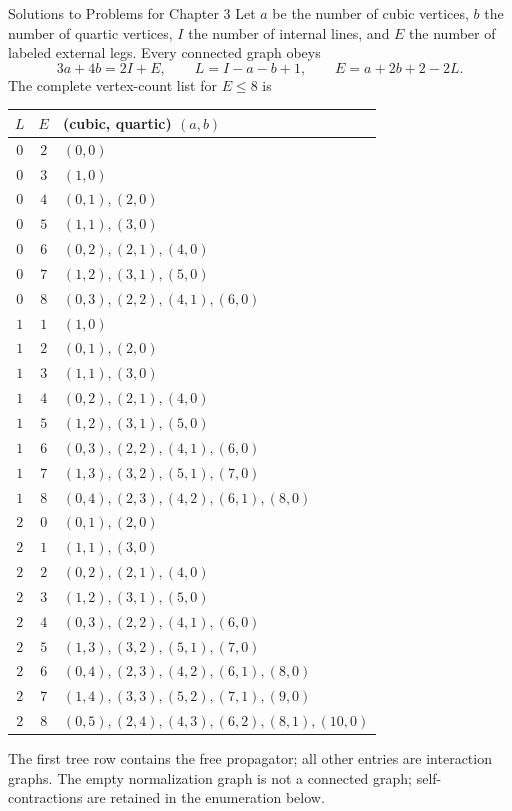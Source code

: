 \begin{bankssolutions}{Solutions to Problems for Chapter 3}
Let $a$ be the number of cubic vertices, $b$ the number of quartic vertices,
$I$ the number of internal lines, and $E$ the number of labeled external legs.
Every connected graph obeys
\begin{equation*}
 3a+4b=2I+E,
 \qquad L=I-a-b+1,
 \qquad E=a+2b+2-2L.
\end{equation*}
The complete vertex-count list for $E\le8$ is
\begin{center}
\small
\begin{tabular}{c|c|l}
 $L$ & $E$ & (cubic, quartic) $(a,b)$ \\ \hline
 $0$ & $2$ & $(0,0)$ \\
 $0$ & $3$ & $(1,0)$ \\
 $0$ & $4$ & $(0,1),(2,0)$ \\
 $0$ & $5$ & $(1,1),(3,0)$ \\
 $0$ & $6$ & $(0,2),(2,1),(4,0)$ \\
 $0$ & $7$ & $(1,2),(3,1),(5,0)$ \\
 $0$ & $8$ & $(0,3),(2,2),(4,1),(6,0)$ \\ \hline
 $1$ & $1$ & $(1,0)$ \\
 $1$ & $2$ & $(0,1),(2,0)$ \\
 $1$ & $3$ & $(1,1),(3,0)$ \\
 $1$ & $4$ & $(0,2),(2,1),(4,0)$ \\
 $1$ & $5$ & $(1,2),(3,1),(5,0)$ \\
 $1$ & $6$ & $(0,3),(2,2),(4,1),(6,0)$ \\
 $1$ & $7$ & $(1,3),(3,2),(5,1),(7,0)$ \\
 $1$ & $8$ & $(0,4),(2,3),(4,2),(6,1),(8,0)$ \\ \hline
 $2$ & $0$ & $(0,1),(2,0)$ \\
 $2$ & $1$ & $(1,1),(3,0)$ \\
 $2$ & $2$ & $(0,2),(2,1),(4,0)$ \\
 $2$ & $3$ & $(1,2),(3,1),(5,0)$ \\
 $2$ & $4$ & $(0,3),(2,2),(4,1),(6,0)$ \\
 $2$ & $5$ & $(1,3),(3,2),(5,1),(7,0)$ \\
 $2$ & $6$ & $(0,4),(2,3),(4,2),(6,1),(8,0)$ \\
 $2$ & $7$ & $(1,4),(3,3),(5,2),(7,1),(9,0)$ \\
 $2$ & $8$ & $(0,5),(2,4),(4,3),(6,2),(8,1),(10,0)$
\end{tabular}
\end{center}
The first tree row contains the free propagator; all other entries are
interaction graphs.  The empty normalization graph is not a connected graph;
self-contractions are retained in the enumeration below.


\end{bankssolutions}
